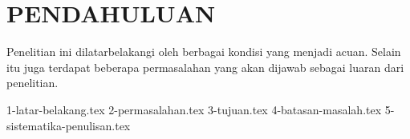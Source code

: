 \chapter{PENDAHULUAN}
\label{chap:pendahuluan}

Penelitian ini dilatarbelakangi oleh berbagai kondisi yang menjadi acuan.
Selain itu juga terdapat beberapa permasalahan yang akan dijawab sebagai luaran dari penelitian.

{1-latar-belakang.tex}
{2-permasalahan.tex}
{3-tujuan.tex}
{4-batasan-masalah.tex}
{5-sistematika-penulisan.tex}
